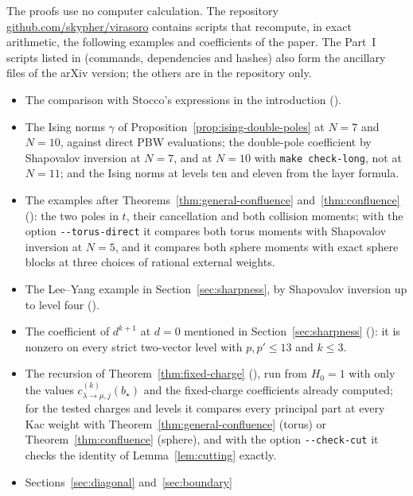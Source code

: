 \documentclass[twoside,10pt]{article}
\numberwithin{equation}{section}
\theoremstyle{slbody}
\theoremstyle{definition}
\theoremstyle{remark}
\begin{document}
The proofs use no computer calculation.  The repository
\href{https://github.com/skypher/virasoro}{github.com/skypher/virasoro}
contains scripts that recompute, in exact arithmetic, the following examples
and coefficients of the paper.  The Part~I scripts listed in
 (commands, dependencies and hashes) also form the
ancillary files of the arXiv version; the others are in the repository only.
\begin{itemize}\setlength{\itemsep}{1pt}
\item The comparison with Stocco's expressions in the introduction
  ().
\item The Ising norms \(\gamma\) of Proposition~\ref{prop:ising-double-poles} at
  \(N=7\) and \(N=10\), against direct PBW evaluations; the double-pole
  coefficient by Shapovalov inversion at \(N=7\), and at \(N=10\) with
  \texttt{make check-long}, not at \(N=11\);
  and the Ising norms at levels ten and eleven from the layer formula.
\item The examples after Theorems~\ref{thm:general-confluence}
  and~\ref{thm:confluence} (): the two
  poles in \(t\), their cancellation and both collision moments; with the
  option \texttt{-{}-torus-direct} it compares both torus moments with
  Shapovalov inversion at \(N=5\), and it compares both sphere moments with
  exact sphere blocks at three choices of rational external weights.
\item The Lee--Yang example in Section~\ref{sec:sharpness}, by Shapovalov
  inversion up to level four ().
\item The coefficient of \(d^{k+1}\) at \(d=0\) mentioned in
  Section~\ref{sec:sharpness} (): it is
  nonzero on every strict two-vector level with \(p,p'\leq13\) and \(k\leq3\).
\item The recursion of Theorem~\ref{thm:fixed-charge}
  (), run from \(H_0=1\) with
  only the values \(c^{(k)}_{\lambda\to\mu,j}(b_\star)\) and the fixed-charge
  coefficients already computed; for the tested charges and levels it compares
  every principal part at every Kac weight with
  Theorem~\ref{thm:general-confluence} (torus) or Theorem~\ref{thm:confluence}
  (sphere), and with the option \texttt{-{}-check-cut} it checks the identity
  of Lemma~\ref{lem:cutting} exactly.
\item Sections~\ref{sec:diagonal} and~\ref{sec:boundary}

\end{itemize}
\end{document}
